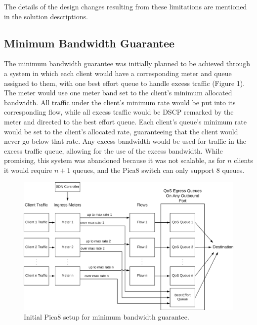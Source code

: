 \documentclass[accepted,single]{gipaper}
\begin{document}
The details of the design changes resulting from these limitations are mentioned in the solution descriptions. 

\subsection{Minimum Bandwidth Guarantee}
\label{min_bandwidth}


The minimum bandwidth guarantee was initially planned to be achieved through a system in which each client would have a corresponding meter and queue assigned to them, with one best effort queue to handle excess traffic (Figure 1). The meter would use one meter band set to the client's minimum allocated bandwidth. All traffic under the client's minimum rate would be put into its corresponding flow, while all excess traffic would be DSCP remarked by the meter and directed to the best effort queue. Each client's queue's minimum rate would be set to the client's allocated rate, guaranteeing that the client would never go below that rate. Any excess bandwidth would be used for traffic in the excess traffic queue, allowing for the use of the excess bandwidth. While promising, this system was abandoned because it was not scalable, as for $n$ clients it would require $n+1$ queues, and the Pica8 switch can only support 8 queues.\\

\begin{figure}
	\centering
	\includegraphics[width=6in]{figs/bwGuar_v1.png}
	\caption{ Initial Pica8 setup for minimum bandwidth guarantee. } \label{bwDiag1}
\end{figure}
\end{document}
